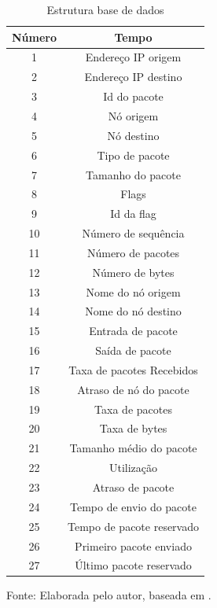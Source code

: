 \begin{table}[!b]
	\centering
	\begin{threeparttable}
		\caption{Estrutura base de dados \cite{DataMining}}
		\label{Tab:DataMining}
		\begin{tabular}{c c }
			\toprule
			\textbf{Número} & \textbf{Tempo}
			\\ \midrule
			1 &  Endereço IP origem  \\ \midrule
			2 &  Endereço IP destino  \\ \midrule
			3 &  Id do pacote  \\ \midrule
			4 &  Nó origem  \\ \midrule
			5 &  Nó destino  \\ \midrule
			6 &  Tipo de pacote  \\ \midrule
			7 &  Tamanho do pacote  \\ \midrule
			8 &  Flags  \\ \midrule
			9 &   Id da flag  \\ \midrule
			10 &  Número de sequência  \\ \midrule
			11 &  Número de pacotes  \\ \midrule
			12 &  Número de bytes  \\ \midrule
			13 &  Nome do nó origem  \\ \midrule
			14 &  Nome do nó destino  \\ \midrule
			15 &  Entrada de pacote  \\ \midrule
			16 &  Saída de pacote  \\ \midrule
			17 &  Taxa de pacotes Recebidos \\ \midrule%
			18 &  Atraso de nó do pacote  \\ \midrule
			19 &  Taxa de pacotes\\ \midrule
			20 &  Taxa de bytes  \\ \midrule
			21 &  Tamanho  médio do pacote  \\ \midrule
			22 &  Utilização  \\ \midrule
			23 &  Atraso de pacote  \\ \midrule
			24 &  Tempo de envio do pacote  \\ \midrule
			25 &  Tempo de pacote reservado  \\ \midrule
			26 &  Primeiro pacote enviado  \\ \midrule
			27 &  Último pacote reservado \\ \bottomrule
		\end{tabular}
		{Fonte: Elaborada pelo autor, baseada em \cite{DataMining}.}
	\end{threeparttable}
\end{table}

